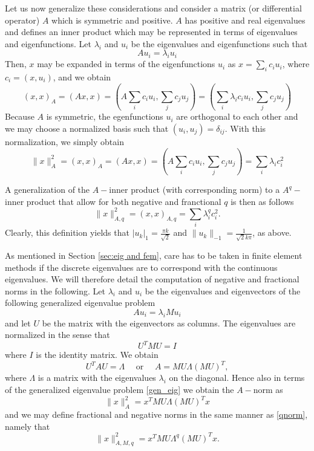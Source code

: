 Let us now generalize these considerations and  consider a matrix 
(or differential operator) $A$ which is
symmetric and positive. $A$ has positive and real
eigenvalues and defines an inner product which may
be represented in terms of eigenvalues and eigenfunctions. Let     
$\lambda_i$ and $u_i$ be the eigenvalues and eigenfunctions
such that 
\[
A u_i = \lambda_i u_i  
\]
Then, $x$ may be expanded in terms of the eigenfunctions $u_i$ as
$x=\sum_i c_i u_i$, where $c_i = (x, u_i)$,  and we obtain 
\[
(x,x)_A = (A x, x) = (A \sum_i c_i u_i  , \sum_j c_j u_j)     
= (\sum_i \lambda_i  c_i u_i  , \sum_j c_j u_j)  
\]
Because $A$ is symmetric, the egenfunctions $u_i$  are orthogonal to each other
and we may choose a normalized basis such that $(u_i, u_j) =  \delta_{ij}$.
With this normalization, we simply obtain
\[
\|x\|_A^2 = (x,x)_A = (A x, x) = (A \sum_i c_i u_i  , \sum_j c_j u_j)     
= \sum_i \lambda_i  c_i^2    
\]


A generalization of the $A-$inner product (with corresponding norm) to 
a $A^q-$inner product that allow for both negative and franctional $q$  
is then as follows
\begin{equation}
\label{qnorm}
\|x\|_{A,q}^2 =  (x,x)_{A,q} =  \sum_i \lambda^q_i c_i^2.     
\end{equation}
Clearly, this definition yields 
that $|u_k|_1 = \frac{\pi k}{\sqrt{2}}$ and 
$\|u_k\|_{-1} = \frac{1}{\sqrt{2} k \pi }$, as above.  

As mentioned in Section \ref{sec:eig and fem}, 
care has to be taken in finite element methods if the discrete eigenvalues
are to correspond with the continuous eigenvalues. We will therefore detail
the computation of negative and fractional norms in the following.   
Let $\lambda_i$ and $u_i$ be the eigenvalues and eigenvectors of the following
generalized eigenvalue problem  
\begin{equation}
\label{gen_eig}
A u_i = \lambda_i M u_i 
\end{equation}
and let $U$ be the matrix with the eigenvectors as columns. 
The eigenvalues are normalized in the sense 
that 
\[
U^T M U = I 
\]
where $I$ is the identity matrix. 
We obtain 
\[
U^T A U = \Lambda \quad \mbox{ or } \quad A = M U \Lambda (M U)^T  ,  
\]
where $\Lambda$ is a matrix with the eigenvalues $\lambda_i$ on the diagonal.  
Hence also in terms of the generalized eigenvalue problem \eqref{gen_eig}
we obtain the $A-$norm as  
\[
\|x\|^2_A = x^T MU \Lambda (MU)^T x   
\]
and  
we may define fractional and negative norms in the same manner
as \eqref{qnorm}, namely that 
\[
\|x\|^2_{A,M,q} = x^T M U \Lambda^q (MU)^T x .     
\]

